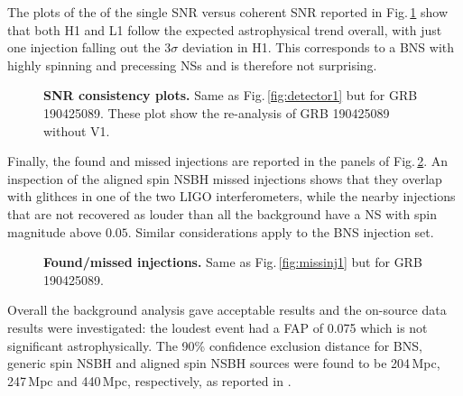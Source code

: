 \documentclass[binding=0.6cm, LaM]{sapthesis}
\begin{document}
	The plots of the of the single SNR versus coherent SNR reported in Fig.\,\ref{fig:detector3_final} show that both H1 and L1
	follow the expected astrophysical trend overall, with just one injection falling out the 3$\sigma$ deviation in H1.  This corresponds to a BNS with highly spinning and precessing NSs and is therefore not surprising.
        \begin{figure}[!t]
          \noindent
          \label{detector3_final}
          \centering
          \caption{\textbf{SNR consistency plots.} Same as Fig.\,\ref{fig:detector1} but for GRB 190425089. These plot show the re-analysis of GRB 190425089 without V1.}
          \label{fig:detector3_final}
        \end{figure}
	
        Finally, the found and missed injections are reported in the panels of Fig.\,\ref{fig:missinj3_5}.  An inspection of the aligned spin NSBH missed injections shows that they overlap with glithces in one of the two LIGO interferometers, while the nearby injections that are not recovered as louder than all the background have a NS with spin magnitude above $0.05$.
        Similar considerations apply to the BNS injection set.
        \begin{figure}[!t]
          \noindent
          \label{missinj3_5}
          \centering
          \caption{\textbf{Found/missed injections.} Same as Fig.\,\ref{fig:missinj1} but for GRB 190425089.}
          \label{fig:missinj3_5}
        \end{figure}
	Overall the background analysis gave acceptable results
	and the on-source data results were investigated: 
	the loudest event had a FAP of 0.075 which is not significant astrophysically.  The 90\% confidence exclusion distance for BNS, generic spin NSBH and aligned spin NSBH sources were found to be 204\,Mpc, 247\,Mpc and 440\,Mpc, respectively, as reported in \cite{43}.
\end{document}
